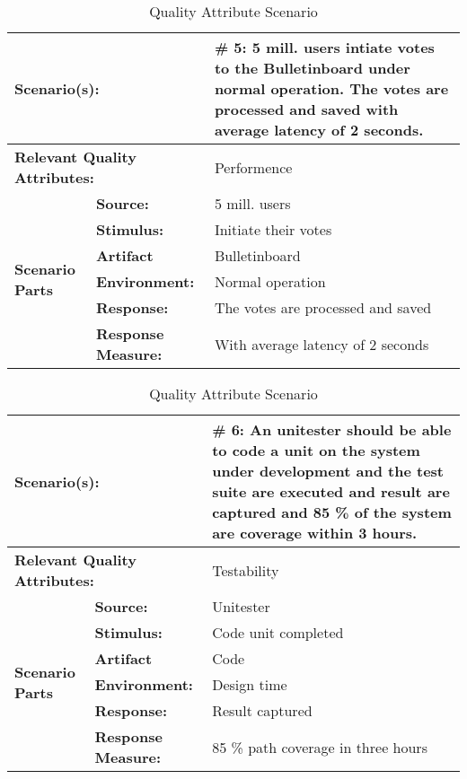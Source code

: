 \begin{table}[H]
\begin{center}
\begin{tabular}{|p{0.3cm}|p{2.5cm}|p{8cm}|}
  \hline
  \multicolumn{2}{|p{3cm}|}{\bfseries Scenario(s):} & \#  5: 5 mill. users intiate votes to the Bulletinboard under normal operation. The votes are processed and saved with average latency of 2 seconds.\\
  \hline
  \multicolumn{2}{|p{3cm}|}{\bfseries Relevant Quality Attributes:} & Performence\\
  \hline
  \multirow{6}{*}{\begin{sideways}{\bfseries Scenario Parts}\end{sideways}}
  & {\bfseries Source:} & 5 mill. users \\
  \cline{2-3}
  & {\bfseries Stimulus:} & Initiate their votes \\
  \cline{2-3}
  & {\bfseries Artifact} &  Bulletinboard \\
  \cline{2-3}
  & {\bfseries Environment:} &  Normal operation \\
  \cline{2-3}
  & {\bfseries Response:} &  The votes are processed and saved\\
  \cline{2-3}
  & {\bfseries Response Measure:} &  With average latency of 2 seconds\\
  \hline
\end{tabular}
\caption{Quality Attribute Scenario}
\end{center}
\end{table}


\begin{table}[H]
\begin{center}
\begin{tabular}{|p{0.3cm}|p{2.5cm}|p{8cm}|}
  \hline
  \multicolumn{2}{|p{3cm}|}{\bfseries Scenario(s):} & \#  6: An unitester should be able to code a unit on the system under development and the test suite are executed and result are captured and 85 \% of the system are coverage within 3 hours. \\
  \hline
  \multicolumn{2}{|p{3cm}|}{\bfseries Relevant Quality Attributes:} & Testability\\
  \hline
  \multirow{6}{*}{\begin{sideways}{\bfseries Scenario Parts}\end{sideways}}
  & {\bfseries Source:} & Unitester \\
  \cline{2-3}
  & {\bfseries Stimulus:} & Code unit completed \\
  \cline{2-3}
  & {\bfseries Artifact} &  Code \\
  \cline{2-3}
  & {\bfseries Environment:} &  Design time \\
  \cline{2-3}
  & {\bfseries Response:} &  Result captured\\
  \cline{2-3}
  & {\bfseries Response Measure:} & 85 \% path coverage in three hours\\
  \hline
\end{tabular}
\caption{Quality Attribute Scenario}
\end{center}
\end{table}

